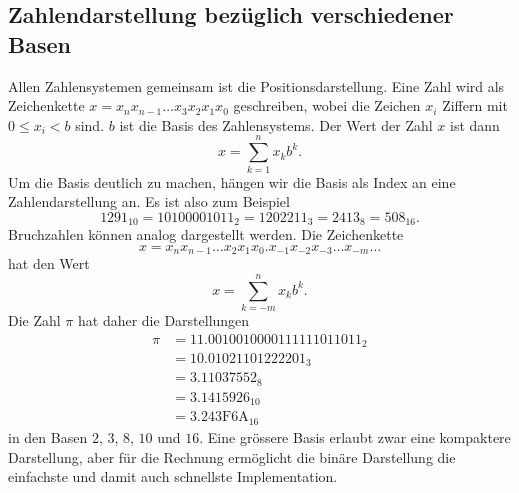 \subsection{Zahlendarstellung bezüglich verschiedener Basen
\label{buch:subsection:basen}}
Allen Zahlensystemen gemeinsam ist die Positionsdarstellung.
%
Eine Zahl wird als Zeichenkette $x=x_nx_{n-1}\dots x_3x_2x_1x_0$
geschreiben,
wobei die Zeichen $x_i$ Ziffern mit $0 \le x_i < b$ sind.
$b$ ist die Basis des Zahlensystems.
%
Der Wert der Zahl $x$ ist dann 
\[
x
=
\sum_{k=1}^n x_kb^k.
\]
Um die Basis deutlich zu machen, 
hängen wir die Basis als Index an eine Zahlendarstellung an.
Es ist also zum Beispiel
\[
1291_{10}
=
10100001011_2
=
1202211_3
=
2413_8
=
508_{16}.
\]
Bruchzahlen können analog dargestellt werden.
%
Die Zeichenkette
\[
x = x_{n}x_{n-1}\dots x_2x_1x_0\texttt{.}x_{-1}x_{-2}x_{-3}\dots x_{-m}\dots
\]
hat den Wert
\[
x = \sum_{k=-m}^n x_kb^k.
\]
Die Zahl $\pi$ hat daher die Darstellungen
%
\begin{align*}
\pi
&=
11.0010010000111111011011_2
\\
&=
10.01021101222201_3
\\
&=
3.11037552_8
\\
&=
3.1415926_{10}
\\
&=
3.243\text{F}6\text{A}_{16}
\end{align*}
in den Basen $2$, $3$, $8$, $10$ und $16$.
Eine grössere Basis erlaubt zwar eine kompaktere Darstellung, aber
für die Rechnung ermöglicht die binäre Darstellung die einfachste
und damit auch schnellste Implementation.

